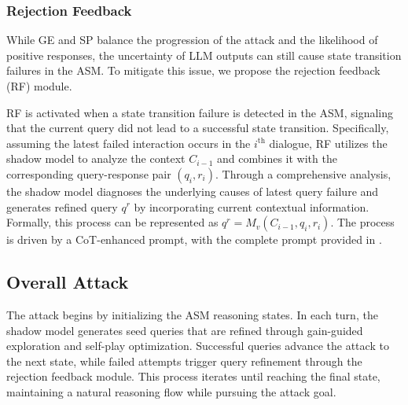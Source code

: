 \subsubsection{Rejection Feedback}

While GE and SP balance the progression of the attack and the likelihood of positive responses, the uncertainty of LLM outputs \cite{unc1,unc2} can still cause state transition failures in the ASM. To mitigate this issue, we propose the rejection feedback (RF) module.

RF is activated when a state transition failure is detected in the ASM, signaling that the current query did not lead to a successful state transition. Specifically, assuming the latest failed interaction occurs in the $i^{\text{th}}$ dialogue, RF utilizes the shadow model to analyze the context $C_{i-1}$ and combines it with the corresponding query-response pair $(q_{i},r_{i})$. Through a comprehensive analysis, the shadow model diagnoses the underlying causes of latest query failure and generates refined query $q^r$  by incorporating current contextual information. Formally, this process can be represented as $q^r = M_v(C_{i-1},q_{i},r_{i})$. The process is driven by a CoT-enhanced prompt, with the complete prompt provided in .

\subsection{Overall Attack}
The attack begins by initializing the ASM reasoning states. In each turn, the shadow model generates seed queries that are refined through gain-guided exploration and self-play optimization. Successful queries advance the attack to the next state, while failed attempts trigger query refinement through the rejection feedback module. This process iterates until reaching the final state, maintaining a natural reasoning flow while pursuing the attack goal.